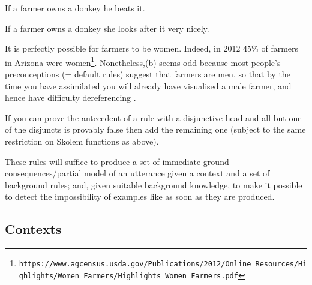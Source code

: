 \documentclass[11pt,a4paper]{article}
\begin{document}
\begin{itemize}
\begin{examples}
\item\label{S:FARMER}
\begin{examples}
\item
If a farmer owns a donkey he beats it.
\item
If a farmer owns a donkey she looks after it very nicely.
\end{examples}
\end{examples}

\noindent
It is perfectly possible for farmers to be women. Indeed, in 2012 45\%
of farmers in Arizona were
women\footnote{\texttt{https://www.agcensus.usda.gov/Publications/2012/Online\_Resources/Highlights/Women\_Farmers/Highlights\_Women\_Farmers.pdf}}. Nonetheless,(b)
seems odd because most people's preconceptions (=
default rules) suggest that farmers are men, so that by the time you
have assimilated  you will already have
visualised a male farmer, and hence have difficulty dereferencing
.

\item
If you can prove the antecedent of a rule with a disjunctive head and
all but one of the disjuncts is provably false then add the remaining
one (subject to the same restriction on Skolem functions as above).
\end{itemize}

These rules will suffice to produce a set of immediate ground
consequences/partial model of an utterance given a context and a set
of background rules; and, given suitable background knowledge, to make
it possible to detect the impossibility of examples like
 as soon as they are produced.

\subsection{Contexts}
\end{document}
